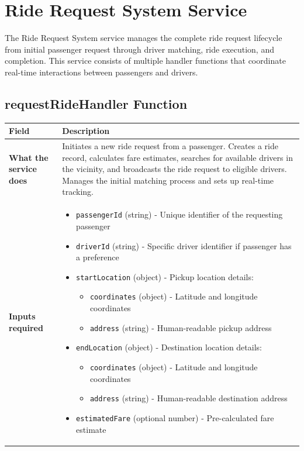 \documentclass[11pt,a4paper]{article}
\begin{document}
\section{Ride Request System Service}

The Ride Request System service manages the complete ride request lifecycle from initial passenger request through driver matching, ride execution, and completion. This service consists of multiple handler functions that coordinate real-time interactions between passengers and drivers.

\subsection{requestRideHandler Function}

\begin{longtable}{|p{3cm}|p{12cm}|}
\hline
\textbf{Field} & \textbf{Description} \\
\hline
\textbf{What the service does} & 
Initiates a new ride request from a passenger. Creates a ride record, calculates fare estimates, searches for available drivers in the vicinity, and broadcasts the ride request to eligible drivers. Manages the initial matching process and sets up real-time tracking. \\
\hline
\textbf{Inputs required} & 
\begin{itemize}[nosep]
\item \texttt{passengerId} (string) - Unique identifier of the requesting passenger
\item \texttt{driverId} (string) - Specific driver identifier if passenger has a preference
\item \texttt{startLocation} (object) - Pickup location details:
  \begin{itemize}[nosep]
    \item \texttt{coordinates} (object) - Latitude and longitude coordinates
    \item \texttt{address} (string) - Human-readable pickup address
  \end{itemize}
\item \texttt{endLocation} (object) - Destination location details:
  \begin{itemize}[nosep]
    \item \texttt{coordinates} (object) - Latitude and longitude coordinates
    \item \texttt{address} (string) - Human-readable destination address
  \end{itemize}
\item \texttt{estimatedFare} (optional number) - Pre-calculated fare estimate

\end{itemize}
\end{longtable}
\end{document}
